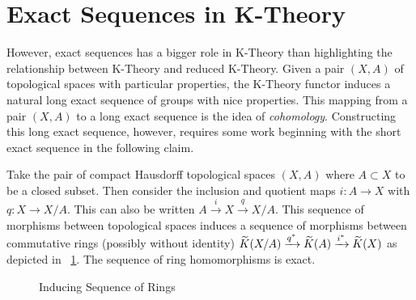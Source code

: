 \documentclass[../sean_thesis.tex]{subfiles}
\begin{document}

\section{Exact Sequences in K-Theory}
However, exact sequences has a bigger role in K-Theory than highlighting the relationship between K-Theory and reduced K-Theory. Given a pair $(X,A)$ of topological spaces with particular properties, the K-Theory functor induces a natural long exact sequence of groups with nice properties. This mapping from a pair $(X,A)$ to a long exact sequence is the idea of \emph{cohomology}. Constructing this long exact sequence, however, requires some work beginning with the short exact sequence in the following claim.

\begin{claim}
\label{thm:subspace_short_exact_sequence}
	Take the pair of compact Hausdorff topological spaces $(X,A)$ where $A \subset X$ to be a closed subset. Then consider the inclusion and quotient maps $i: A \to X$ with $q: X \to X/A$. This can also be written $A \xrightarrow{i} X \xrightarrow{q} X/A$. This sequence of morphisms between topological spaces induces a sequence of morphisms between commutative rings (possibly without identity) $\widetilde{K}(X/A) \xrightarrow{q^{*}} \widetilde{K}(A) \xrightarrow{i^{*}} \widetilde{K}(X)$
as depicted in ~\ref{fig:functor_on_subspace_sequence}. The sequence of ring homomorphisms is exact.
\end{claim}

\begin{figure}[ht!]
	
	\caption{Inducing Sequence of Rings}
	\label{fig:functor_on_subspace_sequence}
\end{figure}

\end{document}
